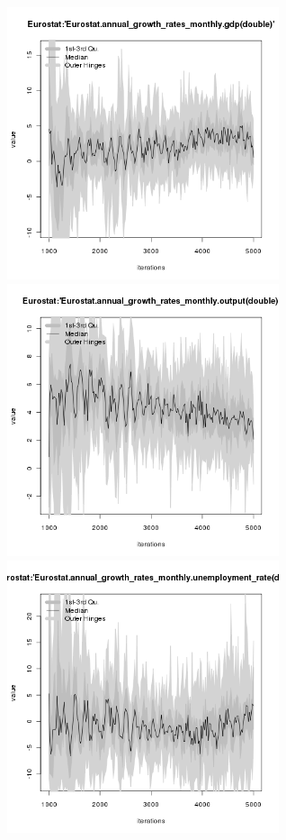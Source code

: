 \begin{figure}[H!]
\centering\leavevmode
\begin{minipage}{17cm}
\centering\leavevmode
\includegraphics[width=8cm]{./png/tax_0.10/Eurostat-annual_growth_rates_monthly_gdp.png}
\includegraphics[width=8cm]{./png/tax_0.10/Eurostat-annual_growth_rates_monthly_output.png}\\
\includegraphics[width=8cm]{./png/tax_0.10/Eurostat-annual_growth_rates_monthly_unemployment_rate.png}

\end{minipage}
\end{figure}
